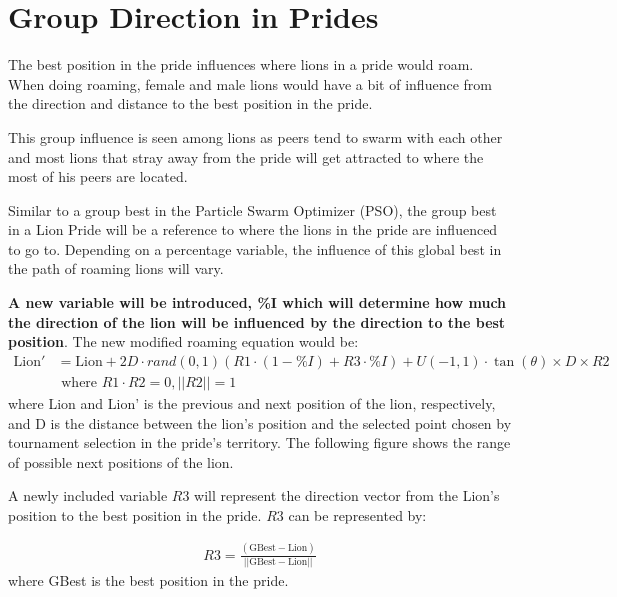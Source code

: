 \section{Group Direction in Prides}
\par The best position in the pride influences where lions in a pride would roam. When doing roaming, female and male lions would have a bit of influence from the direction and distance to the best position in the pride.

\par This group influence is seen among lions as peers tend to swarm with each other and most lions that stray away from the pride will get attracted to where the most of his peers are located.

\par Similar to a group best in the Particle Swarm Optimizer (PSO), the group best in a Lion Pride will be a reference to where the lions in the pride are influenced to go to. Depending on a percentage variable, the influence of this global best in the path of roaming lions will vary.

\par \textbf{A new variable will be introduced, \%I which will determine how much the direction of the lion will be influenced by the direction to the best position}. The new modified roaming equation would be:
\begin{align*}
\text{Lion}' &= \text{Lion} + 2D \cdot rand(0,1) ({R1}\cdot(1-\%I) + R3\cdot\%I) + U(-1,1) \cdot \tan(\theta) \times D \times {R2} \\
&\text{  where } R1 \cdot R2 = 0, ||R2|| = 1
\end{align*}
where Lion and Lion' is the previous and next position of the  lion, respectively, and D is the distance between the  lion's position and the selected point chosen by tournament selection in the pride's territory. The following figure shows the range of possible next positions of the lion.

\par A newly included variable $R3$ will represent the direction vector from the Lion's position to the best position in the pride. $R3$ can be represented by:

\begin{align*}
  R3 = \frac{(\text{GBest} - \text{Lion})}{||\text{GBest} - \text{Lion}||}
\end{align*}
where GBest is the best position in the pride.

